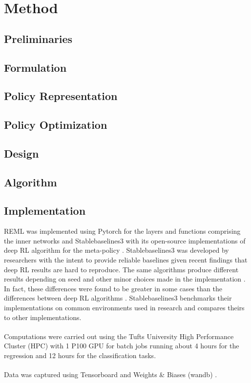 \chapter{Method}
\label{Method}
\section{Preliminaries}
\section{Formulation}
\section{Policy Representation}
\section{Policy Optimization}
\section{Design}
\section{Algorithm}
\section{Implementation}
REML was implemented using Pytorch for the layers and functions comprising the 
inner networks and Stablebaselines3 with its open-source implementations of deep RL 
algorithm for the meta-policy \cite{RafHilGleKanErnDor:21}. 
Stablebaselines3 was developed by researchers with the intent to 
provide reliable baselines given recent findings that deep RL results are hard to 
reproduce. The same algorithms produce different results depending on seed and 
other minor choices made in the implementation \cite{HenIslBacPinPreMeg:18}. 
In fact, these differences were found to be greater in some cases than the differences between
deep RL algorithms \cite{EngIlySanTsi:20}. Stablebaselines3 benchmarks their implementations
on common environments used in research and compares theirs to other implementations.
\\\\
Computations were carried out using the Tufts University High Performance Cluster (HPC) 
with 1 P100 GPU for batch jobs running about 4 hours for the regression and 12
hours for the classification tasks.
\\\\
Data was captured using Tensorboard and Weights \& Biases (wandb) 
\cite{tensorflow2015-whitepaper, wandb}.


\minitoc 
